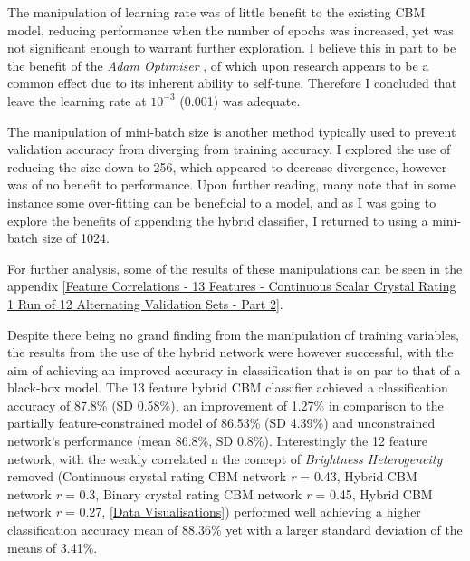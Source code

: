 The manipulation of learning rate was of little benefit to the existing CBM model, reducing performance when the number of epochs was increased, yet was not significant enough to warrant further exploration. I believe this in part to be the benefit of the \emph{Adam Optimiser} \cite{Kingma2014Dec}, of which upon research appears to be a common effect due to its inherent ability to self-tune. Therefore I concluded that leave the learning rate at $10^{-3}$ (0.001) was adequate.

The manipulation of mini-batch size is another method typically used to prevent validation accuracy from diverging from training accuracy. I explored the use of reducing the size down to 256, which appeared to decrease divergence, however was of no benefit to performance. Upon further reading, many note that in some instance some over-fitting can be beneficial to a model, and as I was going to explore the benefits of appending the hybrid classifier, I returned to using a mini-batch size of 1024. 

For further analysis, some of the results of these manipulations can be seen in the appendix \ref{Feature Correlations - 13 Features - Continuous Scalar Crystal Rating 1 Run of 12 Alternating Validation Sets - Part 2}.

Despite there being no grand finding from the manipulation of training variables, the results from the use of the hybrid network were however successful, with the aim of achieving an improved accuracy in classification that is on par to that of a black-box model. The 13 feature hybrid CBM classifier achieved a classification accuracy of 87.8\% (SD 0.58\%), an improvement of 1.27\% in comparison to the partially feature-constrained model of 86.53\% (SD 4.39\%) and unconstrained network’s performance (mean 86.8\%, SD 0.8\%). Interestingly the 12 feature network, with the weakly correlated n the concept of \emph{Brightness Heterogeneity} removed (Continuous crystal rating CBM network \emph{r} = 0.43, Hybrid CBM network \emph{r} = 0.3, Binary crystal rating CBM network \emph{r} = 0.45, Hybrid CBM network \emph{r} = 0.27, \ref{Data Visualisations}) performed well achieving a higher classification accuracy mean of 88.36\% yet with a larger standard deviation of the means of 3.41\%.



